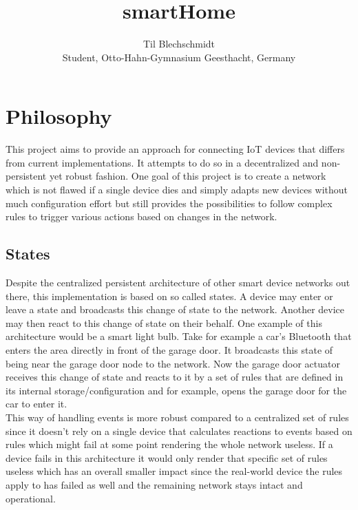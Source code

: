 \documentclass[a4paper]{article}
\title{}
\author{}
\title{smartHome}
\author{Til Blechschmidt\\ Student, Otto-Hahn-Gymnasium Geesthacht, Germany}
\begin{document}
	\maketitle
	\newpage
	
	\tableofcontents
	\listoffigures
	\listoftables
	\newpage
	
	

    \section{Philosophy}
        This project aims to provide an approach for connecting IoT devices that differs from current implementations. It
        attempts to do so in a decentralized and non-persistent yet robust fashion. One goal of this project is to
        create a network which is not flawed if a single device dies and simply adapts new devices without much configuration effort
        but still provides the possibilities to follow complex rules to trigger various actions based on changes in the network.
        \subsection{States}
	        Despite the centralized persistent architecture of other smart device networks out there, this implementation is
	        based on so called states. A device may enter or leave a state and broadcasts this change of state to the network.
	        Another device may then react to this change of state on their behalf. One example of this architecture would be a smart
	        light bulb. Take for example a car's Bluetooth that enters the area directly in front of the garage door. It broadcasts
	        this state of being near the garage door node to the network. Now the garage door actuator receives this change of state
	        and reacts to it by a set of rules that are defined in its internal storage/configuration and for example, opens the garage
	        door for the car to enter it.\\
	        This way of handling events is more robust compared to a centralized set of rules since it doesn't rely on a single device
	        that calculates reactions to events based on rules which might fail at some point rendering the whole network useless. If a
	        device fails in this architecture it would only render that specific set of rules useless which has an
	        overall smaller impact since the real-world device the rules apply to has failed as well and the remaining
	        network stays intact and operational.
\end{document}
